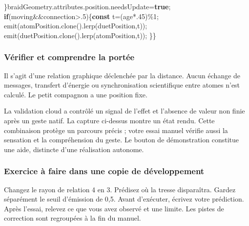 \documentclass[
  canadien,
  11pt,
  letterpaper,
]{article}
\newenvironment{Shaded}{}{}
\newcommand{\AttributeTok}[1]{\textcolor[rgb]{0.49,0.56,0.16}{#1}}
\newcommand{\ControlFlowTok}[1]{\textcolor[rgb]{0.00,0.44,0.13}{\textbf{#1}}}
\newcommand{\DecValTok}[1]{\textcolor[rgb]{0.25,0.63,0.44}{#1}}
\newcommand{\FunctionTok}[1]{\textcolor[rgb]{0.02,0.16,0.49}{#1}}
\newcommand{\KeywordTok}[1]{\textcolor[rgb]{0.00,0.44,0.13}{\textbf{#1}}}
\newcommand{\NormalTok}[1]{#1}
\newcommand{\OperatorTok}[1]{\textcolor[rgb]{0.40,0.40,0.40}{#1}}
\begin{document}
\begin{Shaded}
\begin{Highlighting}[]
\NormalTok{\}braidGeometry}\OperatorTok{.}\AttributeTok{attributes}\OperatorTok{.}\AttributeTok{position}\OperatorTok{.}\AttributeTok{needsUpdate}\OperatorTok{=}\KeywordTok{true}\OperatorTok{;}
\ControlFlowTok{if}\NormalTok{(moving}\OperatorTok{\&\&}\NormalTok{connection}\OperatorTok{\textgreater{}.}\DecValTok{5}\NormalTok{)\{}\KeywordTok{const}\NormalTok{ t}\OperatorTok{=}\NormalTok{(age}\OperatorTok{*.}\DecValTok{45}\NormalTok{)}\OperatorTok{\%}\DecValTok{1}\OperatorTok{;}
\FunctionTok{emit}\NormalTok{(atomPosition}\OperatorTok{.}\FunctionTok{clone}\NormalTok{()}\OperatorTok{.}\FunctionTok{lerp}\NormalTok{(duetPosition}\OperatorTok{,}\NormalTok{t))}\OperatorTok{;}
\FunctionTok{emit}\NormalTok{(duetPosition}\OperatorTok{.}\FunctionTok{clone}\NormalTok{()}\OperatorTok{.}\FunctionTok{lerp}\NormalTok{(atomPosition}\OperatorTok{,}\NormalTok{t))}\OperatorTok{;}
\NormalTok{\}\}}
\end{Highlighting}
\end{Shaded}

\subsubsection{Vérifier et comprendre la
portée}\label{vuxe9rifier-et-comprendre-la-portuxe9e-13}

Il s'agit d'une relation graphique déclenchée par la distance. Aucun
échange de messages, transfert d'énergie ou synchronisation scientifique
entre atomes n'est calculé. Le petit compagnon a une position fixe.

La validation cloud a contrôlé un signal de l'effet et l'absence de
valeur non finie après un geste natif. La capture ci-dessus montre un
état rendu. Cette combinaison protège un parcours précis ; votre essai
manuel vérifie aussi la sensation et la compréhension du geste. Le
bouton de démonstration constitue une aide, distincte d'une réalisation
autonome.

\subsubsection{Exercice à faire dans une copie de
développement}\label{exercice-uxe0-faire-dans-une-copie-de-duxe9veloppement-13}

Changez le rayon de relation 4 en 3. Prédisez où la tresse disparaîtra.
Gardez séparément le seuil d'émission de 0,5. Avant d'exécuter, écrivez
votre prédiction. Après l'essai, relevez ce que vous avez observé et une
limite. Les pistes de correction sont regroupées à la fin du manuel.
\end{document}
